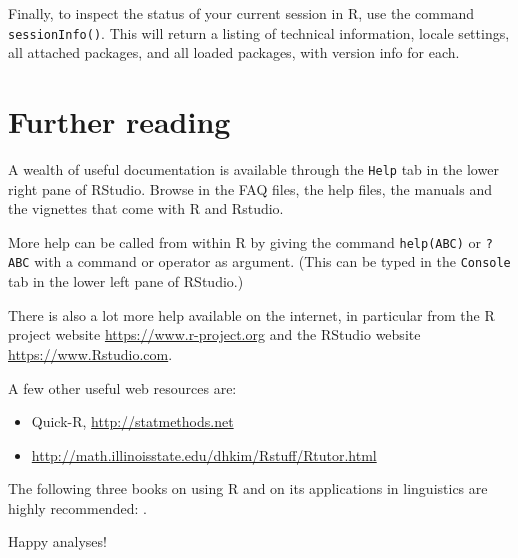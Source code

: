 \documentclass[]{book}
\begin{document}
Finally, to inspect the status of your current session in R, use the command \texttt{sessionInfo()}. This will return a listing of technical information, locale settings, all attached packages, and all loaded packages, with version info for each.

\hypertarget{sec:furtherreading}{%
\chapter{Further reading}\label{sec:furtherreading}}

A wealth of useful documentation is available through the \texttt{Help} tab
in the lower right pane of RStudio. Browse in the FAQ files, the help files, the
manuals and the vignettes that come with R and Rstudio.

More help can be called from within R by giving the command
\texttt{help(ABC)} or \texttt{?ABC} with a
command or operator as argument.
(This can be typed in the \texttt{Console} tab in the lower left pane of RStudio.)

There is also a lot more help available on the internet, in particular
from the R project website \url{https://www.r-project.org}
and the RStudio website \url{https://www.Rstudio.com}.

A few other useful web resources are:

\begin{itemize}
\item
  Quick-R, \url{http://statmethods.net}
\item
  \url{http://math.illinoisstate.edu/dhkim/Rstuff/Rtutor.html}
\end{itemize}

The following three books on using R and on its
applications in linguistics are highly recommended:
\citep{baay08, john08, adler10}.

Happy analyses!


\end{document}
